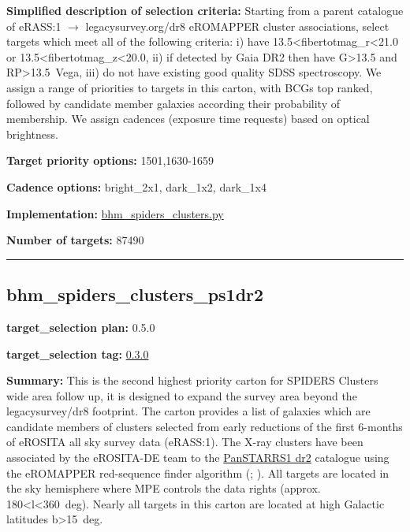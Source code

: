 \noindent\textbf{Simplified description of selection criteria:} Starting from a
parent catalogue of eRASS:1 $\rightarrow$ legacysurvey.org/dr8 eROMAPPER cluster
associations, select targets which meet all of the following criteria:
i) have 13.5\textless fibertotmag\_r\textless21.0 or
13.5\textless fibertotmag\_z\textless20.0, ii) if detected by Gaia DR2
then have G\textgreater13.5 and RP\textgreater13.5~Vega, iii) do not
have existing good quality SDSS spectroscopy. We assign a range of
priorities to targets in this carton, with BCGs top ranked, followed by
candidate member galaxies according their probability of membership. We
assign cadences (exposure time requests) based on optical brightness.


\noindent\textbf{Target priority options:} 1501,1630-1659

\noindent\textbf{Cadence options:} bright\_2x1, dark\_1x2, dark\_1x4

\noindent\textbf{Implementation:}
\href{https://github.com/sdss/target_selection/blob/0.3.0/python/target_selection/cartons/bhm_spiders_clusters.py}{bhm\_spiders\_clusters.py}

\noindent\textbf{Number of targets:} 87490

\begin{center}\rule{0.5\linewidth}{0.5pt}\end{center}

\hypertarget{bhm_spiders_clusters_ps1dr2_plan0.5.0}{%
\subsection{bhm\_spiders\_clusters\_ps1dr2}\label{bhm_spiders_clusters_ps1dr2_plan0.5.0}}

\noindent\textbf{target\_selection plan:} 0.5.0

\noindent\textbf{target\_selection tag:}
\href{https://github.com/sdss/target_selection/tree/0.3.0/}{0.3.0}

\noindent\textbf{Summary:} This is the second highest priority carton for SPIDERS
Clusters wide area follow up, it is designed to expand the survey area
beyond the legacysurvey/dr8 footprint. The carton provides a list of
galaxies which are candidate members of clusters selected from early
reductions of the first 6-months of eROSITA all sky survey data
(eRASS:1). The X-ray clusters have been associated by the eROSITA-DE
team to the
\href{https://outerspace.stsci.edu/display/PANSTARRS/}{PanSTARRS1 dr2}
catalogue using the eROMAPPER red-sequence finder algorithm
(\citealt{Rykoff2014};
\citealt{IderChitham2020}). All targets are located in the sky hemisphere
where MPE controls the data rights (approx.
180\textless l\textless360~deg). Nearly all targets in this carton are
located at high Galactic latitudes \textbar b\textbar\textgreater15~deg.

